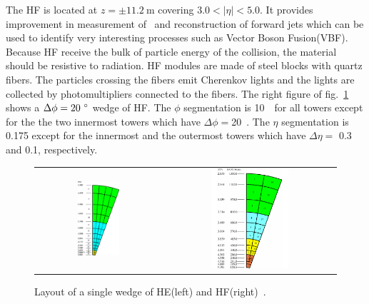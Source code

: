 The HF is located at $z = \pm 11.2~\textrm{m}$ covering $3.0 < |\eta| < 5.0$. 
It provides improvement in measurement of \met\ 
and reconstruction of forward jets which can be used to identify very interesting 
processes such as Vector Boson Fusion(VBF).%
Because HF receive the bulk of particle energy of the collision, 
the material should be resistive to radiation. 
HF modules are made of steel blocks with quartz fibers.
The particles crossing the fibers emit Cherenkov lights 
and the lights are collected by photomultipliers connected to 
the fibers. The right figure of fig.~\ref{fig:hcal_HEHF} shows 
a $\Delta \phi=20~^\circ$ wedge of HF.  
The $\phi$ segmentation is 10~\dg\ for all towers except for the 
the two innermost towers which have $\Delta \phi=$20~\dg. 
The $\eta$ segmentation is 0.175 except for the innermost 
and the outermost towers which have $\Delta \eta=$ 0.3 and 0.1, respectively. 
%
\begin{figure}[h] 
\vspace{1cm}
\centering 
\begin{tabular}{cc} 
\includegraphics[width=0.35\textwidth]{figures/Figure_005-002-a.pdf} & 
\includegraphics[width=0.47\textwidth]{figures/Figure_005-002-b.pdf} \\
\end{tabular} 
\caption{Layout of a single wedge of HE(left) and HF(right)~\cite{cmstdr1}.}
\label{fig:hcal_HEHF} 
\end{figure} 

